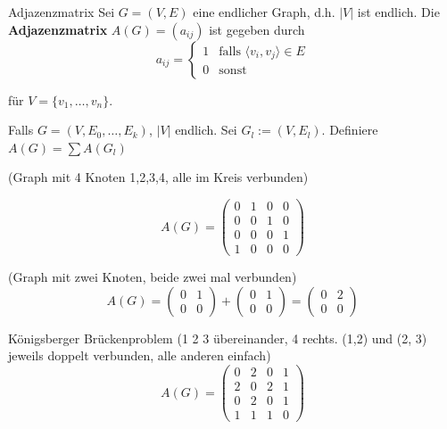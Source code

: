 \documentclass[12pt]{article}
\begin{document}
\begin{definition}{Adjazenzmatrix}{}
    Sei $G = (V, E)$ eine endlicher Graph, d.h. $|V|$ ist endlich. Die \textbf{Adjazenzmatrix} $A(G) = (a_{ij})$ ist gegeben durch
    $$
        a_{ij} = \begin{cases}
            1 & \text{falls } \langle v_i, v_j \rangle \in E \\
            0 & \text{sonst}
        \end{cases}
    $$

    für $V = \{v_1,\dots,v_n\}$.

    Falls $G = (V, E_0,\dots,E_k)$, $|V|$ endlich. Sei $G_l := (V, E_l)$. Definiere $A(G) = \sum A(G_l)$
\end{definition}

\begin{example}{}{}
    (Graph mit 4 Knoten 1,2,3,4, alle im Kreis verbunden)

    $$
        A(G) = \begin{pmatrix}
            0 & 1 & 0 & 0 \\
            0 & 0 & 1 & 0\\
            0 & 0 & 0 & 1\\
            1 & 0 & 0 & 0
        \end{pmatrix}
    $$
\end{example}

\begin{example}{}{}
    (Graph mit zwei Knoten, beide zwei mal verbunden) 
    $$
        A(G) = \begin{pmatrix}
            0 & 1 \\
            0 & 0
        \end{pmatrix} + \begin{pmatrix}
            0 & 1 \\
            0 & 0
        \end{pmatrix} = \begin{pmatrix}
            0 & 2 \\
            0 & 0
        \end{pmatrix}
    $$
\end{example}

\begin{example}{Königsberger Brückenproblem}{}
    (1 2 3 übereinander, 4 rechts. (1,2) und (2, 3) jeweils doppelt verbunden, alle anderen einfach)
    $$
        A(G) = \begin{pmatrix}
            0 & 2 & 0 & 1\\
            2 & 0 & 2 & 1\\
            0 & 2 & 0 & 1\\
            1 & 1 & 1 & 0
        \end{pmatrix}
    $$
\end{example}
\end{document}
